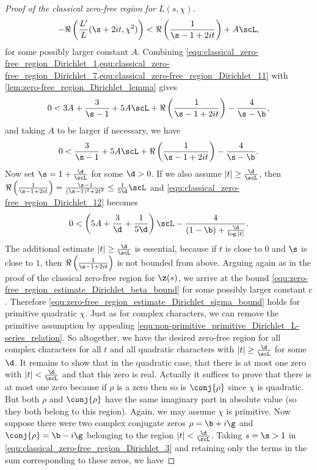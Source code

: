 \begin{proof}[Proof of the classical zero-free region for $L(s,\chi)$]
        \begin{equation}\label{equ:classical_zero-free_region_Dirichlet_11}
          -\Re\left(\frac{L'}{L}(\s+2it,\chi^{2})\right) < \Re\left(\frac{1}{\s-1+2it}\right)+A\scL,
        \end{equation}
        for some possibly larger constant $A$. Combining \cref{equ:classical_zero-free_region_Dirichlet_1,equ:classical_zero-free_region_Dirichlet_7,equ:classical_zero-free_region_Dirichlet_11} with \cref{lem:zero-free_region_Dirichlet_lemma} gives
        \[
          0 < 3A+\frac{3}{\s-1}+5A\scL+\Re\left(\frac{1}{\s-1+2it}\right)-\frac{4}{\s-\b},
        \]
        and taking $A$ to be larger if necessary, we have
        \begin{equation}\label{equ:classical_zero-free_region_Dirichlet_12}
          0 < \frac{3}{\s-1}+5A\scL+\Re\left(\frac{1}{\s-1+2it}\right)-\frac{4}{\s-\b}.
        \end{equation}
        Now set $\s = 1+\frac{\d}{\scL}$ for some $\d > 0$. If we also assume $|t| \ge \frac{\d}{\scL}$, then $\Re\left(\frac{1}{\s-1+2it}\right) = \frac{\s-1}{(\s-1)^{2}+2t^{2}} \le \frac{1}{5\d}\scL$ and \cref{equ:classical_zero-free_region_Dirichlet_12} becomes
        \[
          0 < \left(5A+\frac{3}{\d}+\frac{1}{5\d}\right)\scL-\frac{4}{(1-\b)+\frac{\d}{\log|t|}}.
        \]
        The additional estimate $|t| \ge \frac{\d}{\scL}$ is essential, because if $t$ is close to $0$ and $\s$ is close to $1$, then $\Re\left(\frac{1}{\s-1+2it}\right)$ is not bounded from above. Arguing again as in the proof of the classical zero-free region for $\z(s)$, we arrive at the bound \cref{equ:zero-free_region_estimate_Dirichlet_beta_bound} for some possibly larger constant $c$. Therefore \cref{equ:zero-free_region_estimate_Dirichlet_sigma_bound} holds for primitive quadratic $\chi$. Just as for complex characters, we can remove the primitive assumption by appealing \cref{equ:non-primitive_primitive_Dirichlet_L-series_relation}. So altogether, we have the desired zero-free region for all complex characters for all $t$ and all quadratic characters with $|t| \ge \frac{\d}{\scL}$ for some $\d$. It remains to show that in the quadratic case, that there is at most one zero with $|t| < \frac{\d}{\scL}$ and that this zero is real. Actually it suffices to prove that there is at most one zero because if $\rho$ is a zero then so is $\conj{\rho}$ since $\chi$ is quadratic. But both $\rho$ and $\conj{\rho}$ have the same imaginary part in absolute value (so they both belong to this region). Again, we may assume $\chi$ is primitive. Now suppose there were two complex conjugate zeros $\rho = \b+i\g$ and $\conj{\rho} = \b-i\g$ belonging to the region $|t| < \frac{\d}{\scL}$. Taking $s = \s > 1$ in \cref{equ:classical_zero-free_region_Dirichlet_3} and retaining only the terms in the sum corresponding to these zeros, we have

\end{proof}
